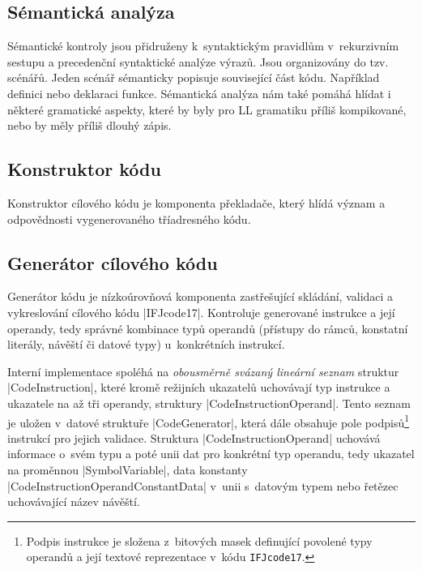 \subsection{Sémantická analýza}
Sémantické kontroly jsou přidruženy k~syntaktickým pravidlům v~rekurzivním sestupu a
precedenční syntaktické analýze výrazů. Jsou organizovány do tzv. scénářů. Jeden scénář
sémanticky popisuje související část kódu. Například definici
nebo deklaraci funkce. Sémantická analýza nám také pomáhá hlídat i některé gramatické aspekty,
které by byly pro LL gramatiku příliš kompikované, nebo by měly příliš dlouhý zápis.


\subsection{Konstruktor kódu}
\label{subsec:code-constructor}
Konstruktor cílového kódu je komponenta překladače, který hlídá význam a odpovědnosti vygenerovaného tříadresného kódu.

\subsection{Generátor cílového kódu}
Generátor kódu je nízkoúrovňová komponenta zastřešující skládání, validaci a vykreslování cílového kódu \ic|IFJcode17|.
Kontroluje generované instrukce a její operandy, tedy správné kombinace typů operandů (přístupy do rámců, konstatní
literály, návěští či datové typy) u~konkrétních instrukcí.

Interní implementace spoléhá na \emph{obousměrně svázaný lineární seznam} struktur \ic|CodeInstruction|, které kromě
režijních ukazatelů uchovávají typ instrukce a ukazatele na až tři operandy, struktury \ic|CodeInstructionOperand|.
Tento seznam je uložen v~datové struktuře \ic|CodeGenerator|, která dále obsahuje pole podpisů\footnote{Podpis
instrukce je složena z~bitových masek definující povolené typy operandů a její textové reprezentace v~kódu
\texttt{IFJcode17}.} instrukcí pro jejich validace.
Struktura \ic|CodeInstructionOperand| uchovává informace o~svém typu a poté unii dat pro konkrétní typ operandu, tedy
ukazatel na proměnnou \ic|SymbolVariable|,
data konstanty \ic|CodeInstructionOperandConstantData| v~unii s~datovým typem nebo řetězec uchovávající název návěští.

